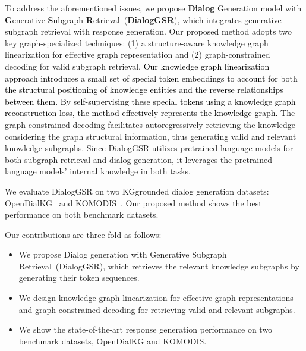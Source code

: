 {To address the aforementioned issues, we propose \textbf{Dialog} Generation model with \textbf{G}enerative \textbf{S}ubgraph \textbf{R}etrieval~(\textbf{DialogGSR}), which integrates generative subgraph retrieval with response generation. 
Our proposed method adopts two key graph-specialized techniques: (1) a structure-aware knowledge graph linearization for effective graph representation and (2) graph-constrained decoding for valid subgraph retrieval.}
\textcolor{black}{Our knowledge graph linearization approach introduces a small set of special token embeddings to account for both the structural positioning of knowledge entities and the reverse relationships between them. By self-supervising these special tokens using a knowledge graph reconstruction loss, the method effectively represents the knowledge graph.}
The graph-constrained decoding facilitates autoregressively retrieving the knowledge considering the graph structural information, thus generating valid and relevant knowledge subgraphs.
Since DialogGSR utilizes pretrained language models for both subgraph retrieval and dialog generation, it leverages the pretrained language models' internal knowledge in both tasks.

We evaluate DialogGSR on two KG{\textendash}grounded dialog generation datasets: OpenDialKG~\cite{moon2019opendialkg} and KOMODIS~\cite{galetzka2020corpus}.
Our proposed method shows the best performance on both benchmark datasets.

Our contributions are three-fold as follows:
\begin{itemize}
    \item We propose Dialog generation with Generative Subgraph Retrieval~(DialogGSR), which retrieves the relevant knowledge subgraphs by generating their token sequences. 
    \item We design knowledge graph linearization for effective graph representations and graph-constrained decoding for retrieving valid and relevant subgraphs.
    \item We show the state-of-the-art response generation performance on two benchmark datasets, OpenDialKG and KOMODIS.
\end{itemize}